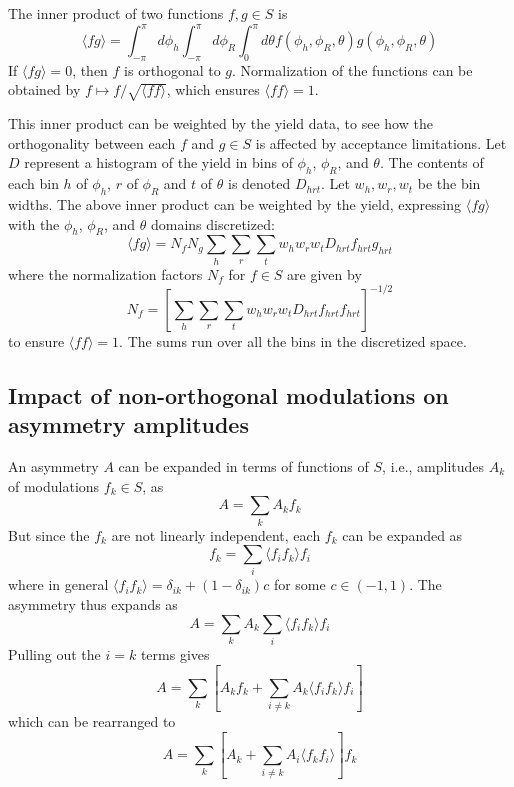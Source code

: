 \documentclass[12pt]{article}
\begin{document}
The inner product of two functions $f,g\in S$ is
\begin{equation}
\langle fg\rangle=
\int_{-\pi}^{\pi}d\phi_h
\int_{-\pi}^{\pi}d\phi_R
\int_{0}^{\pi}d\theta
f\left(\phi_h,\phi_R,\theta\right)
g\left(\phi_h,\phi_R,\theta\right)
\end{equation}
If $\langle fg\rangle=0$, then $f$ is orthogonal to $g$. Normalization of the
functions can be obtained by $f\mapsto f/\sqrt{\langle ff\rangle}$, which
ensures $\langle ff\rangle=1$.  

This inner product can be weighted by the yield data, to see how the
orthogonality between each $f$ and $g\in S$ is affected by acceptance
limitations.  Let $D$ represent a histogram of the yield in bins of $\phi_h$,
$\phi_R$, and $\theta$.  The contents of each bin $h$ of $\phi_h$, $r$ of
$\phi_R$ and $t$ of $\theta$ is denoted $D_{hrt}$. Let $w_h,w_r,w_t$ be the bin
widths.  The above inner product can be weighted by the yield, expressing
$\langle fg\rangle$ with the $\phi_h$, $\phi_R$, and $\theta$ domains
discretized:
\begin{equation}
\displaystyle
\langle fg\rangle=
N_fN_g
\sum_h\sum_r\sum_t
w_hw_rw_tD_{hrt}f_{hrt}g_{hrt}
\end{equation}
where the normalization factors $N_f$ for $f\in S$ are given by
\begin{equation}
N_f=
\left[
\sum_h\sum_r\sum_t
w_hw_rw_tD_{hrt}f_{hrt}f_{hrt}
\right]^{-1/2}
\end{equation}
to ensure $\langle ff\rangle=1$. The sums run over all the bins in the
discretized space.

\subsection*{Impact of non-orthogonal modulations on asymmetry amplitudes}
An asymmetry $A$ can be expanded in terms of functions of $S$, i.e., amplitudes
$A_k$ of modulations $f_k\in S$, as
\begin{equation}
A=\sum_k{A_kf_k}
\end{equation}
But since the $f_k$ are not linearly independent, each $f_k$ can be expanded
as 
\begin{equation}
f_k=\sum_i{\langle f_if_k\rangle f_i}
\end{equation}
where in general $\langle f_if_k\rangle=\delta_{ik}+\left(1-\delta_{ik}\right)c$
for some $c\in(-1,1)$. The asymmetry thus
expands as
\begin{equation}
A=\sum_k{A_k\sum_i{\langle f_if_k\rangle f_i}}
\end{equation}
Pulling out the $i=k$ terms gives
\begin{equation}
A=\sum_k\left[A_kf_k+\sum_{i\neq k}{A_k\langle f_if_k\rangle f_i}
\right]
\end{equation}
which can be rearranged to
\begin{equation}
A=\sum_k\left[A_k+\sum_{i\neq k}{A_i\langle f_kf_i\rangle}
\right]f_k
\end{equation}
\end{document}
